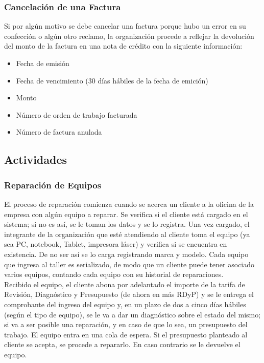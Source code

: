 \documentclass[12pt]{extarticle}
\begin{document}
\begin{spacing}{1.2}
        \subsubsection*{Cancelación de una Factura}
        Si por algún motivo se debe cancelar una factura porque hubo un error en su confección o algún otro reclamo, la organización procede a reflejar la devolución del monto de la factura en una nota de crédito con la siguiente información: \\
        \begin{itemize}
            \item Fecha de emisión
            \item Fecha de vencimiento (30 días hábiles de la fecha de emición)
            \item Monto
            \item Número de orden de trabajo facturada
            \item Número de factura anulada
        \end{itemize}

        \pagebreak
        \subsection{Actividades}

        \subsubsection{Reparación de Equipos}
        El proceso de reparación comienza cuando se acerca un cliente a la oficina de la empresa con algún equipo a reparar. Se verifica si el cliente está cargado en el sistema; si no es así, se le toman los datos y se lo registra. Una vez cargado, el integrante de la organización que esté atendiendo al cliente toma el equipo (ya sea PC, notebook, Tablet, impresora láser) y verifica si se encuentra en existencia. De no ser así se lo carga registrando marca y modelo. Cada equipo que ingresa al taller es serializado, de modo que un cliente puede tener asociado varios equipos, contando cada equipo con su historial de reparaciones.\\

        Recibido el equipo, el cliente abona por adelantado el importe de la tarifa de Revisión, Diagnóstico y Presupuesto (de ahora en más RDyP) y se le entrega el comprobante del ingreso del equipo y, en un plazo de dos a cinco días hábiles (según el tipo de equipo), se le va a dar un diagnóstico sobre el estado del mismo; si va a ser posible una reparación, y en caso de que lo sea, un presupuesto del trabajo. El equipo entra en una cola de espera. Si el presupuesto planteado al cliente se acepta, se procede a repararlo. En caso contrario se le devuelve el equipo.\\


\end{spacing}
\end{document}
